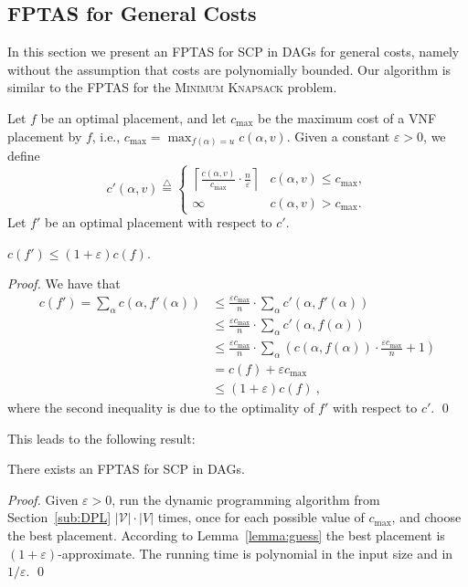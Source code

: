 \documentclass[runningheads]{llncs}
\newcommand{\eqdf}{\stackrel{\scriptscriptstyle \triangle}{=}}
\newcommand{\paren}[1]{\left( #1 \right)}
\newcommand{\abs}[1]{\left| #1 \right|}
\newcommand{\ceil}[1]{\left\lceil {#1} \right\rceil}
\newcommand{\eps}{\varepsilon}
\newcommand{\scp}{\textsc{SCP}\xspace}
\newcommand{\calV}{\mathcal{V}}
\begin{document}

\subsection{FPTAS for General Costs}
\label{sub:fptas}

In this section we present an FPTAS for \scp in DAGs for general
costs, namely without the assumption that costs are polynomially
bounded.  Our algorithm is similar to the FPTAS for the
\textsc{Minimum Knapsack} problem.

Let $f$ be an optimal placement, and let $c_{\max}$ be the maximum
cost of a VNF placement by $f$, i.e., $c_{\max} = \max_{f(\alpha) =
  u} c(\alpha,v)$.
%
Given a constant $\eps>0$, we define
\[
c'(\alpha, v) \eqdf
\begin{cases}
\ceil{\frac{c(\alpha, v)}{c_{\max}} \cdot \frac{n}{\eps}}
       & c(\alpha, v) \leq c_{\max}, \\
\infty & c(\alpha, v) > c_{\max}.
\end{cases}
\]
Let $f'$ be an optimal placement with respect to $c'$.

\begin{lemma}
\label{lemma:guess}
$c(f') \leq (1+\eps)c(f)$.
\end{lemma}
\begin{proof}
We have that
\begin{align*}
c(f')
=    \sum_{\alpha} c(\alpha,f'(\alpha)) %
& \leq \frac{\eps c_{\max}}{n} \cdot \sum_{\alpha} c'(\alpha,f'(\alpha)) \\
& \leq \frac{\eps c_{\max}}{n} \cdot \sum_{\alpha} c'(\alpha,f(\alpha)) \\
& \leq \frac{\eps c_{\max}}{n} \cdot
     \sum_{\alpha}
       \paren{ c(\alpha,f(\alpha)) \cdot \frac{\eps c_{\max}}{n} + 1} \\
& =    c(f) + \eps c_{\max} \\
& \leq (1+\eps) c(f)
~,
\end{align*}
where the second inequality is due to the optimality of $f'$ with
respect to $c'$.
%
\qed
\end{proof}

This leads to the following result:

\begin{theorem}
\label{thm:fptas}
There exists an FPTAS for \scp in DAGs.
\end{theorem}
\begin{proof}
Given $\eps>0$, run the dynamic programming algorithm from
Section~\ref{sub:DPL} $\abs{\calV} \cdot \abs{V}$ times, once for each
possible value of $c_{\max}$, and choose the best placement.
According to Lemma~\ref{lemma:guess} the best placement is
$(1+\eps)$-approximate.  The running time is polynomial in the input
size and in $1/\eps$.
%
\qed
\end{proof}
\end{document}
